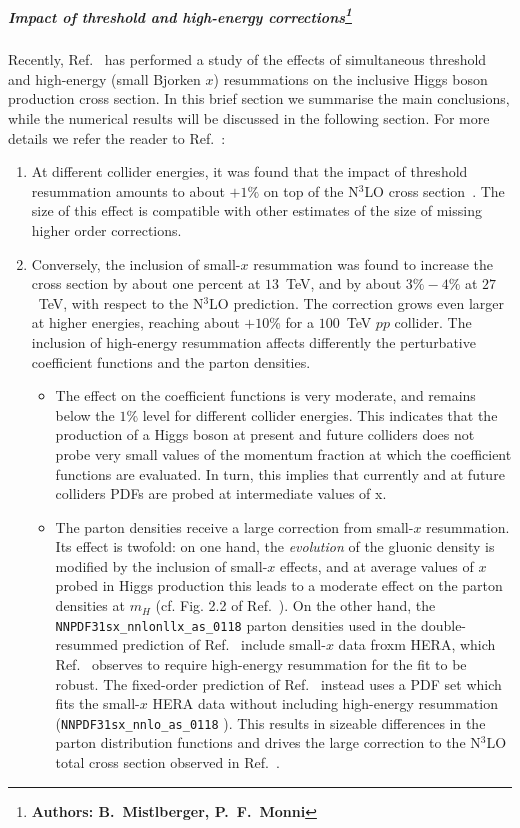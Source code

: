 \subparagraph{Impact of threshold and high-energy
  corrections\footnote{\bf Authors: B.~Mistlberger, P.~F.~Monni}}
Recently, Ref.~\cite{Bonvini:2018ixe} has performed a study of the
effects of simultaneous threshold and high-energy (small Bjorken $x$)
resummations on the inclusive Higgs boson production cross section. In this brief
section we summarise the main conclusions, while the numerical results
will be discussed in the following section. For more details we refer
the reader to Ref.~\cite{Bonvini:2018ixe}:
\begin{enumerate}
\item At different collider energies, it was found that the impact of
  threshold resummation amounts to about $+1\%$ on top of the N$^3$LO
  cross section~\cite{Bonvini:2016frm}. The size of this effect is
  compatible with other estimates of the size of missing higher order
  corrections.
\item Conversely, the inclusion of small-$x$ resummation was found to
  increase the cross section by about one percent at $13$~TeV, and by
  about $3\%-4\%$ at $27$~TeV, with respect to the N$^3$LO
  prediction. The correction grows even larger at higher 
  energies, reaching about $+10\%$ for a $100$~TeV $pp$ collider. The
  inclusion of high-energy resummation affects differently the
  perturbative coefficient functions and the parton densities.
\begin{itemize}
\item The effect on the coefficient functions is very moderate, and
  remains below the $1\%$ level for different collider energies. This
  indicates that the production of a Higgs boson at present and future
  colliders does not probe very small values of the momentum fraction
  at which the coefficient functions are evaluated.
  In turn, this implies that currently and at future colliders PDFs are probed at intermediate values of x.

\item The parton densities receive a large correction from small-$x$
  resummation. Its effect is twofold: on one hand, the {\it evolution}
  of the gluonic density is modified by the inclusion of small-$x$
  effects, and at average values of $x$ probed in Higgs production
  this leads to a moderate effect on the parton densities at $m_H$
  (cf. Fig. 2.2 of Ref.~\cite{Ball:2017otu}). On the other hand, the
  \verb+NNPDF31sx_nnlonllx_as_0118+
  \cite{Ball:2017otu} parton densities used in the double-resummed prediction of
  Ref.~\cite{Bonvini:2018ixe}  include small-$x$ data froxm HERA, which
  Ref.~\cite{Ball:2017otu} observes to require high-energy resummation
  for the fit to be robust. The fixed-order prediction of
  Ref.~\cite{Bonvini:2018ixe} instead uses a PDF set which fits the
  small-$x$ HERA data without including high-energy resummation
  (\verb+NNPDF31sx_nnlo_as_0118+ \cite{Ball:2017otu}).  This results
  in sizeable differences in the parton distribution functions and
  drives the large correction to the N$^3$LO total cross section
  observed in Ref.~\cite{Bonvini:2018ixe}.
\end{itemize}
\end{enumerate}
